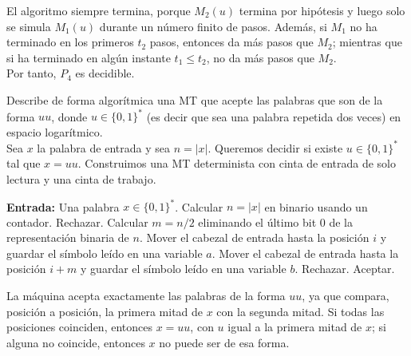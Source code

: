 \documentclass[12pt]{article}
\begin{document}
\begin{ejercicio}[2.4 puntos]
\begin{enumerate}
            El algoritmo siempre termina, porque $M_2(u)$ termina por hipótesis y luego
            solo se simula $M_1(u)$ durante un número finito de pasos. Además, si $M_1$
            no ha terminado en los primeros $t_2$ pasos, entonces da más pasos que $M_2$;
            mientras que si ha terminado en algún instante $t_1\leq t_2$, no da más pasos
            que $M_2$. \\

            Por tanto, $P_4$ es decidible.
        \end{enumerate}
    \end{ejercicio}

    \newpage

    \begin{ejercicio}[1.3 puntos]
        Describe de forma algorítmica una MT que acepte las palabras que son de la forma $uu$, donde $u \in \{0,1\}^{*}$ 
        (es decir que sea una palabra repetida dos veces) en espacio logarítmico. \\

        Sea $x$ la palabra de entrada y sea $n=|x|$. Queremos decidir si existe
        $u\in\{0,1\}^*$ tal que $x=uu$. Construimos una MT determinista con cinta
        de entrada de solo lectura y una cinta de trabajo.

        \begin{algorithm}
        \caption{MT para $L=\{uu : u\in\{0,1\}^*\}$}
        \label{algorithm:uu-log}
        \begin{algorithmic}
        \State \textbf{Entrada:} Una palabra $x\in\{0,1\}^*$.
        \State Calcular $n=|x|$ en binario usando un contador.
            \State Rechazar.
        \EndIf
        \State Calcular $m=n/2$ eliminando el último bit $0$ de la representación binaria de $n$.
            \State Mover el cabezal de entrada hasta la posición $i$ y guardar el símbolo leído en una variable $a$.
            \State Mover el cabezal de entrada hasta la posición $i+m$ y guardar el símbolo leído en una variable $b$.
                \State Rechazar.
            \EndIf
        \EndFor
        \State Aceptar.
        \end{algorithmic}
        \end{algorithm}

        La máquina acepta exactamente las palabras de la forma $uu$, ya que compara,
        posición a posición, la primera mitad de $x$ con la segunda mitad. Si todas las
        posiciones coinciden, entonces $x=uu$, con $u$ igual a la primera mitad de $x$;
        si alguna no coincide, entonces $x$ no puede ser de esa forma. \\


\end{ejercicio}
\end{document}
